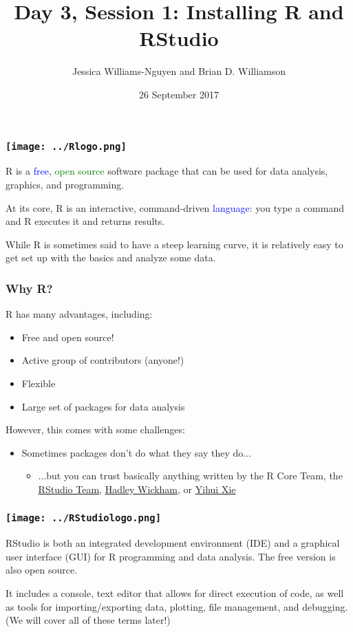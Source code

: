 \documentclass[11pt]{beamer}
\title{Day 3, Session 1: Installing R and RStudio}
\author{Jessica Williams-Nguyen and Brian D. Williamson}
\institute{EPI/BIOST Bootcamp 2017}
\date{26 September 2017}
\newcommand{\myframe}[1]{\begin{frame} \frametitle{#1}}
\newenvironment{spaceitemize}
{ \begin{itemize}
    \setlength{\itemsep}{10pt}
    \setlength{\parskip}{0pt}
    \setlength{\parsep}{0pt}     }
{ \end{itemize}                  }
\begin{document}
\begin{frame}
\titlepage
\end{frame}

\myframe{\texttt{[image: ../Rlogo.png]}}
R is a \textcolor{blue}{free}, \textcolor{green}{open source} software package that can be used for data analysis, graphics, and programming. 

At its core, R is an interactive, command-driven \textcolor{blue}{language}: you type a command and R executes it and returns results. 

While R is sometimes said to have a steep learning curve, it is relatively easy to get set up with the basics and analyze some data.
\end{frame}

\myframe{Why R?}
R has many advantages, including:
\begin{spaceitemize}
\item Free and open source!
\item Active group of contributors (anyone!)
\item Flexible
\item Large set of packages for data analysis
\end{spaceitemize}

However, this comes with some challenges:
\begin{spaceitemize}
\item Sometimes packages don't do what they say they do...
\begin{itemize}
\item ...but you can trust basically anything written by the R Core Team, the \href{https://www.rstudio.com/products/rpackages/}{RStudio Team}, \href{http://hadley.nz/}{Hadley Wickham}, or \href{https://github.com/yihui}{Yihui Xie}
\end{itemize}
\end{spaceitemize}
\end{frame}


\myframe{\texttt{[image: ../RStudiologo.png]}}
RStudio is both an integrated development environment (IDE) and a graphical user interface (GUI) for R programming and data analysis. The free version is also open source.

It includes a console, text editor that allows for direct execution of code, as well as tools for importing/exporting data, plotting, file management, and debugging. (We will cover all of these terms later!)
\end{frame}
\end{document}

